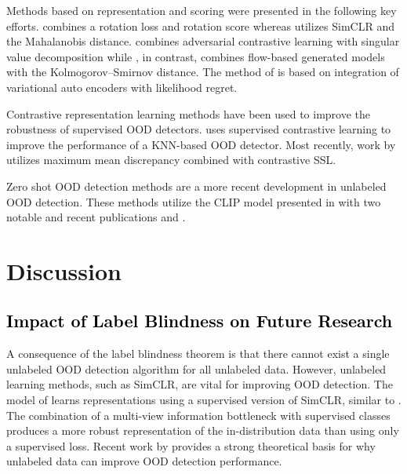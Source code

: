 \documentclass{article} %
\theoremstyle{plain}
\theoremstyle{definition}
\theoremstyle{remark}
\begin{document}
Methods based on representation and scoring were presented in the following key efforts. \citep{hendrycks2019using} combines a rotation loss and rotation score whereas \citep{sehwag2021ssd} utilizes SimCLR \citep{chen2020simple} and the Mahalanobis distance. \citep{khalid2022rodd} combines adversarial contrastive learning with singular value decomposition while \citep{zhang2021understanding}, in contrast, combines flow-based generated models with the Kolmogorov–Smirnov distance. The method of \citep{xiao2020likelihood} is based on integration of variational auto encoders with likelihood regret. 

Contrastive representation learning methods have been used to improve the robustness of supervised OOD detectors. \citep{sun2022out} uses supervised contrastive learning \citep{khosla2020supervised} to improve the performance of a KNN-based OOD detector. Most recently, work by \citep{guille2024cadet} utilizes maximum mean discrepancy combined with contrastive SSL. 

Zero shot OOD detection methods are a more recent development in unlabeled OOD detection. These methods utilize the CLIP model presented in \citep{radford2021learning} with two notable and recent publications \citep{esmaeilpour2022zero} and \citep{wang2023clipn}.



\vspace{-2mm}\section{Discussion}\vspace{-2mm}

\subsection{\textcolor{black}{Impact of Label Blindness on Future Research}}\vspace{-2mm}

A consequence of the label blindness theorem is that there cannot exist a single unlabeled OOD detection algorithm for all unlabeled data. However, unlabeled learning methods, such as SimCLR, are vital for improving OOD detection. The model of \citep{sun2022out} learns representations using a supervised version of SimCLR, similar to \citep{khosla2020supervised}. The combination of a multi-view information bottleneck with supervised classes produces a more robust representation of the in-distribution data than using only a supervised loss. Recent work by \citep{du2024does} provides a strong theoretical basis for why unlabeled data can improve OOD detection performance.
\end{document}
